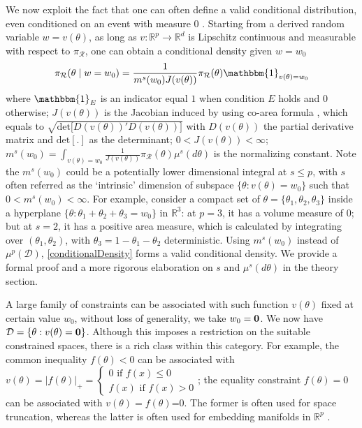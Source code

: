 \documentclass[10pt,fleqn]{article}
\newcommand{\be}{\begin{equation}\begin{aligned}}
\newcommand{\ee}{\end{aligned}\end{equation}}
\newcommand{\bb}[1]{\mathbb{#1}}
\newcommand{\mc}[1]{\mathcal{#1}}
\DeclareMathOperator{\1}{\mathbbm{1}}
\begin{document}
We now exploit the fact that one can often define a valid conditional distribution,
even conditioned on an event with measure $0$ \citep{kolmogorov1950foundations}.
Starting from  a derived random variable $w=v(\theta)$, as long as $v:\bb R^p\rightarrow \bb R^d$ is  Lipschitz
continuous and measurable with respect to $\pi_{\mc R}$, one can obtain a conditional density given $w=w_0$ 
\be
\label{conditionalDensity}
\pi_{\mc R}(\theta \mid w=w_0) = \frac{1}{m^s(w_0) J(v(\theta))} \pi_{\mc R}(\theta) \mathbbm{1}_{v(\theta)=w_0}
\ee
where $\mathbbm{1}_{E}$ is an indicator equal $1$ when condition
$E$ holds and $0$ otherwise; $J(v(\theta))$ is the Jacobian induced by using
co-area formula \citep{federer2014geometric}, which equals to
$\sqrt{\mbox{det[}D(v(\theta))'
D(v(\theta))]}$ with $D(v(\theta))$ the partial derivative matrix and $\text{det}[.]$
as the determinant; $0<J(v(\theta))<\infty$; $m^s(w_0)=\int_{v(\theta)=w_0} \frac{1}{J(v(\theta))} \pi_{\mc R}(\theta) \mu^s(d\theta) $ is the normalizing constant. Note the $m^s(w_0)$  could be a potentially lower dimensional integral at  $s\le p$, with
$s$ often referred as the `intrinsic' dimension of subspace $\{\theta: v(\theta)=w_0\}$
such that   $0<m^s(w_0)<\infty$.  For example, consider a compact set of $\theta=\{\theta_1,\theta_2,\theta_3\}$ inside a
hyperplane $\{\theta: \theta_1+\theta_2+\theta_3=w_0\}$ in $\bb R^3$: at $p=3$, it has a volume measure of $0$;  but at $s=2$, it has a  positive area measure, which is calculated by integrating over $(\theta_1,\theta_2)$, with $\theta_3=1-\theta_1-\theta_2$ deterministic. Using $m^s(w_0)$
instead of $\mu^p(\mc D)$, \eqref{conditionalDensity} forms a valid conditional density. We provide  a  formal proof and a more rigorous elaboration on  $s$ and $\mu^s(d\theta)$  
in the theory section.

A large family of constraints can be
associated with such function $v(\theta)$ fixed at certain value $w_0$, without
loss of generality, we take $w_0=\bf 0$. We now have
 $\mc D =\{\theta:
v(\theta)={\bf 0}\}$. Although this imposes a
restriction  on the suitable constrained spaces, there is a rich class within this category.
For example, the common  inequality $f(\theta)<0$ can be associated with $v(\theta)=|f(\theta)|_+=\left\{\begin{array}{cc}  0 \text{ if } f(x)\le 0
\\ f(x) \text{ if } f(x)> 0\end{array}\right.$; the 
equality constraint $f(\theta)=0$ can be associated with $v(\theta)=f(\theta)$=0. The former is often used for space truncation, whereas the latter is often used for  embedding manifolds   in $\bb R^p$ \citep{do2016differential}. 
\end{document}
